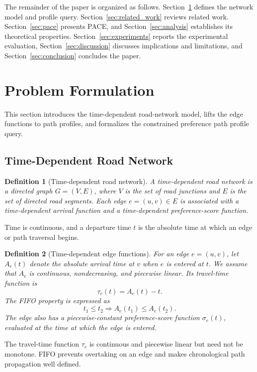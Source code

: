 \documentclass[a4paper,fleqn]{cas-dc}
\newtheorem{definition}{Definition}
\begin{document}
The remainder of the paper is organized as follows. Section~\ref{sec:problem_formulation} defines the network model and profile query. Section~\ref{sec:related_work} reviews related work. Section~\ref{sec:pace} presents PACE, and Section~\ref{sec:analysis} establishes its theoretical properties. Section~\ref{sec:experiments} reports the experimental evaluation, Section~\ref{sec:discussion} discusses implications and limitations, and Section~\ref{sec:conclusion} concludes the paper.

\section{Problem Formulation}
\label{sec:problem_formulation}

This section introduces the time-dependent road-network model, lifts the edge functions to path profiles, and formalizes the constrained preference path profile query.

\subsection{Time-Dependent Road Network}
\label{subsec:td_network}

\begin{definition}[Time-dependent road network]
A time-dependent road network is a directed graph \(G=(V,E)\), where \(V\) is the set of road junctions and \(E\) is the set of directed road segments. Each edge \(e=(u,v)\in E\) is associated with a time-dependent arrival function and a time-dependent preference-score function.
\end{definition}

Time is continuous, and a departure time \(t\) is the absolute time at which an edge or path traversal begins.

\begin{definition}[Time-dependent edge functions]
For an edge \(e=(u,v)\), let \(A_e(t)\) denote the absolute arrival time at \(v\) when \(e\) is entered at \(t\). We assume that \(A_e\) is continuous, nondecreasing, and piecewise linear. Its travel-time function is
\[
\tau_e(t)=A_e(t)-t.
\]
The FIFO property is expressed as
\[
t_1\leq t_2 \Longrightarrow A_e(t_1)\leq A_e(t_2).
\]
The edge also has a piecewise-constant preference-score function \(\sigma_e(t)\), evaluated at the time at which the edge is entered.
\end{definition}

The travel-time function \(\tau_e\) is continuous and piecewise linear but need not be monotone. FIFO prevents overtaking on an edge and makes chronological path propagation well defined.
\end{document}
